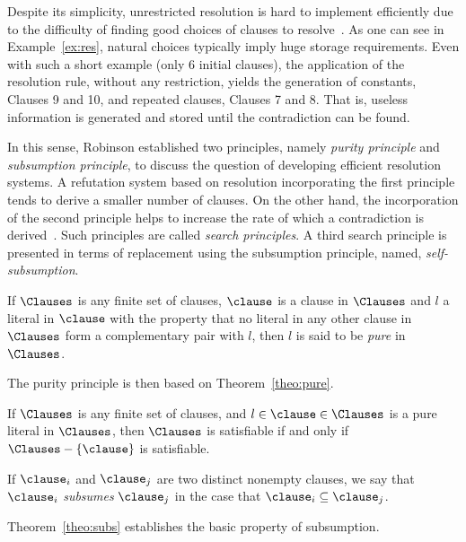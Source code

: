Despite its simplicity, unrestricted resolution is hard to implement efficiently
due to the difficulty of finding good choices of clauses to
resolve~\cite{satchapter}. As one can see in Example~\ref{ex:res}, natural
choices typically imply huge storage requirements. Even with such a short
example (only 6 initial clauses), the application of the resolution rule,
without any restriction, yields the generation of constants, Clauses 9 and 10, and repeated
clauses, Clauses 7 and 8. That is, useless information is generated and stored
until the contradiction can be found. 

In this sense, Robinson established two principles, namely \emph{purity
principle} and \emph{subsumption principle}, to discuss the question of
developing efficient resolution systems. A refutation system based on resolution
incorporating the first principle tends to derive a smaller number of clauses.
On the other hand, the incorporation of the second principle helps to increase
the rate of which a contradiction is derived~\cite{Robinson65}. Such principles
are called \emph{search principles}.  A third search principle is presented in
terms of replacement using the subsumption principle, named,
\emph{self-subsumption}. 

\begin{definition}
    If $\Clauses$ is any finite set of clauses, $\clause$ is a clause in
    $\Clauses$ and $l$ a literal in $\clause$ with the property that no literal
    in any other clause in $\Clauses$ form a complementary pair with $l$, then
    $l$ is said to be \emph{pure} in $\Clauses$.
\end{definition}

The purity principle is then based on Theorem~\ref{theo:pure}.

\begin{theorem}%
    \label{theo:pure}
    If $\Clauses$ is any finite set of clauses, and $l \in \clause \in \Clauses$
    is a pure literal in $\Clauses$, then $\Clauses$ is satisfiable if and only
    if $\Clauses - \{\clause\}$ is satisfiable.
\end{theorem}

\begin{definition}
    If $\clause_i$ and $\clause_j$ are two distinct nonempty clauses, we say
    that $\clause_i$ \emph{subsumes} $\clause_j$ in the case that $\clause_i
    \subseteq \clause_j$. 
\end{definition}

Theorem~\ref{theo:subs} establishes the basic property of subsumption.

